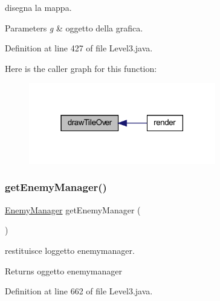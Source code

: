disegna la mappa. 


\begin{DoxyParams}{Parameters}
{\em g} & oggetto della grafica. \\
\hline
\end{DoxyParams}


Definition at line 427 of file Level3.\+java.

Here is the caller graph for this function\+:\nopagebreak
\begin{figure}[H]
\begin{center}
\leavevmode
\includegraphics[width=231pt]{classscenes_1_1_level3_ac299bbbbb70f97ae032c1345d5937378_icgraph}
\end{center}
\end{figure}
\mbox{\label{classscenes_1_1_level3_afdfe86992bb21f6ad2d9aea028b7896a}} 
\subsubsection{\texorpdfstring{get\+Enemy\+Manager()}{getEnemyManager()}}
{\footnotesize\ttfamily \hyperlink{classmanagers_1_1_enemy_manager}{Enemy\+Manager} get\+Enemy\+Manager (\begin{DoxyParamCaption}{ }\end{DoxyParamCaption})}



restituisce l\textquotesingle{}oggetto enemymanager. 

\begin{DoxyReturn}{Returns}
oggetto enemymanager 
\end{DoxyReturn}


Definition at line 662 of file Level3.\+java.

\mbox{\label{classscenes_1_1_level3_af5e9f906de91e4d6400bb7f27cd563f3}} 
